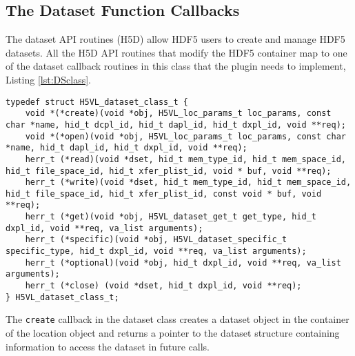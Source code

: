 \subsection{The Dataset Function Callbacks}
The dataset API routines (H5D) allow HDF5 users to create and manage
HDF5 datasets. All the H5D API routines that modify the HDF5 container
map to one of the dataset callback routines in this class that the
plugin needs to implement, Listing \ref{lst:DSclass}.

\begin{lstlisting}[caption={Structure for dataset callback routines, H5VLpublic.h}, captionpos=b, label={lst:DSclass}]
typedef struct H5VL_dataset_class_t {
    void *(*create)(void *obj, H5VL_loc_params_t loc_params, const char *name, hid_t dcpl_id, hid_t dapl_id, hid_t dxpl_id, void **req);
    void *(*open)(void *obj, H5VL_loc_params_t loc_params, const char *name, hid_t dapl_id, hid_t dxpl_id, void **req);
    herr_t (*read)(void *dset, hid_t mem_type_id, hid_t mem_space_id, hid_t file_space_id, hid_t xfer_plist_id, void * buf, void **req);
    herr_t (*write)(void *dset, hid_t mem_type_id, hid_t mem_space_id, hid_t file_space_id, hid_t xfer_plist_id, const void * buf, void **req);
    herr_t (*get)(void *obj, H5VL_dataset_get_t get_type, hid_t dxpl_id, void **req, va_list arguments);
    herr_t (*specific)(void *obj, H5VL_dataset_specific_t specific_type, hid_t dxpl_id, void **req, va_list arguments);
    herr_t (*optional)(void *obj, hid_t dxpl_id, void **req, va_list arguments);
    herr_t (*close) (void *dset, hid_t dxpl_id, void **req);
} H5VL_dataset_class_t;
\end{lstlisting}

The \texttt{create} callback in the dataset class creates a dataset
object in the container of the location object and returns a pointer
to the dataset structure containing information to access the dataset
in future calls.\bigskip

